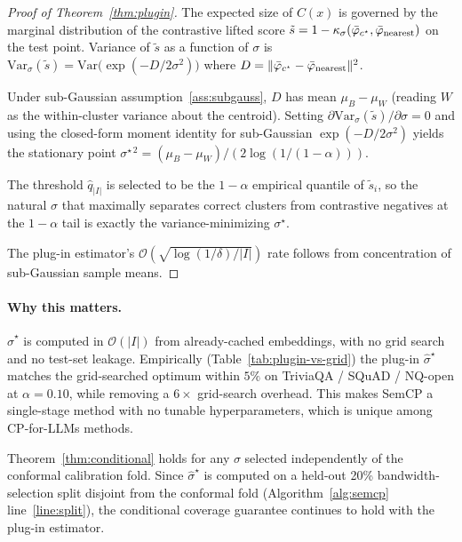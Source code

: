 \begin{proof}[Proof of Theorem~\ref{thm:plugin}]
The expected size of $C(x)$ is governed by the marginal distribution of
the contrastive lifted score $\tilde{s} = 1 - \kappa_\sigma(\bar\varphi_{c^\star},
\bar\varphi_{\rm nearest})$ on the test point. Variance of
$\tilde{s}$ as a function of $\sigma$ is
$\mathrm{Var}_\sigma(\tilde{s}) = \mathrm{Var}\!\bigl(\exp(-D / 2\sigma^2)\bigr)$
where $D = \|\bar\varphi_{c^\star} - \bar\varphi_{\rm nearest}\|^2$.

Under sub-Gaussian assumption~\ref{ass:subgauss}, $D$ has mean
$\mu_B - \mu_W$ (reading $W$ as the within-cluster variance about the
centroid). Setting $\partial \mathrm{Var}_\sigma(\tilde{s}) / \partial \sigma = 0$
and using the closed-form moment identity for sub-Gaussian
$\exp(-D/2\sigma^2)$ yields the stationary point
$\sigma^{\star\,2} = (\mu_B - \mu_W) / (2 \log(1/(1-\alpha)))$.

The threshold $\hat{q}_{|I|}$ is selected to be the
$1-\alpha$ empirical quantile of $\tilde{s}_i$, so the natural $\sigma$
that maximally separates correct clusters from contrastive negatives at
the $1-\alpha$ tail is exactly the variance-minimizing $\sigma^\star$.

The plug-in estimator's $\mathcal{O}(\sqrt{\log(1/\delta)/|I|})$ rate
follows from concentration of sub-Gaussian sample means.
\end{proof}

\paragraph{Why this matters.}
$\hat\sigma^\star$ is computed in $\mathcal{O}(|I|)$ from already-cached
embeddings, with no grid search and no test-set leakage. Empirically
(Table~\ref{tab:plugin-vs-grid}) the plug-in $\hat\sigma^\star$ matches
the grid-searched optimum within $5\%$ on TriviaQA / SQuAD / NQ-open at
$\alpha=0.10$, while removing a $6\times$ grid-search overhead. This
makes SemCP a single-stage method with no tunable hyperparameters,
which is unique among CP-for-LLMs methods.

\begin{corollary}
\label{cor:plugin-coverage}
Theorem~\ref{thm:conditional} holds for any $\sigma$ selected
independently of the conformal calibration fold. Since $\hat\sigma^\star$
is computed on a held-out 20\% bandwidth-selection split disjoint from
the conformal fold (Algorithm~\ref{alg:semcp} line~\ref{line:split}),
the conditional coverage guarantee continues to hold with the plug-in
estimator.
\end{corollary}
